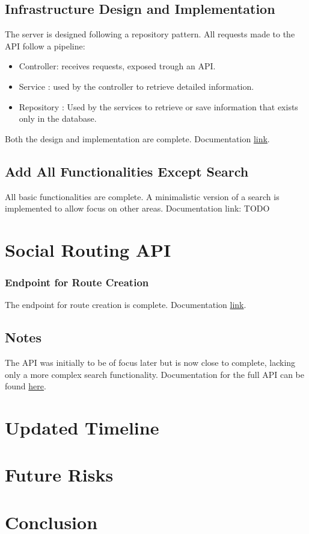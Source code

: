\documentclass{article}
\begin{document}
        \subsection*{Infrastructure Design and Implementation}
        The server is designed following a repository pattern. All requests made to the API follow a pipeline:
        \begin{itemize}
            \item Controller: receives requests, exposed trough an API.
            \item Service : used by the controller to retrieve detailed information.
            \item Repository : Used by the services to retrieve or save information that exists only in the database.
        \end{itemize}
        Both the design and implementation are complete.
        Documentation \href{https://github.com/baltasarb/social-routing/wiki/4.-Server-design-and-implementation}{link}.

        \subsection*{Add All Functionalities Except Search}
        All basic functionalities are complete. A minimalistic version of a search is implemented to allow focus on other areas.
        Documentation link: TODO

    \newpage

    \section{Social Routing API}    
        \subsubsection*{Endpoint for Route Creation}
        The endpoint for route creation is complete.
        Documentation \href{https://github.com/baltasarb/social-routing/wiki/Social-Routing-API#create-route}{link}.
        \subsection*{Notes}
        The API was initially to be of focus later but is now close to complete, lacking only a more complex search functionality.
        Documentation for the full API can be found \href{https://github.com/baltasarb/social-routing/wiki/Social-Routing-API}{here}. 
        
    \section{Updated Timeline}

    \section{Future Risks}

    \section{Conclusion}
        
\end{document}
